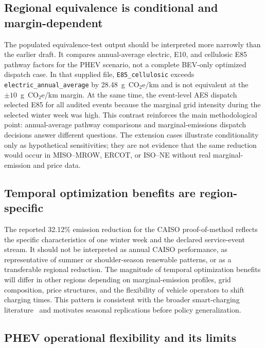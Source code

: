 \documentclass[cleantechnol,article,submit,pdftex,moreauthors]{Definitions/mdpi}
\newcommand{\gcoeqkm}{g~CO$_2$e/km}
\begin{document}
\subsection{Regional equivalence is conditional and margin-dependent}
\label{subsec:discuss_equivalence}

The populated equivalence-test output should be interpreted more narrowly than the earlier draft. It compares annual-average electric, E10, and cellulosic E85 pathway factors for the PHEV scenario, not a complete BEV-only optimized dispatch case. In that supplied file, \texttt{E85\_cellulosic} exceeds \texttt{electric\_annual\_average} by 28.48~\gcoeqkm{} and is not equivalent at the $\pm10$~\gcoeqkm{} margin. At the same time, the event-level AES dispatch selected E85 for all audited events because the marginal grid intensity during the selected winter week was high. This contrast reinforces the main methodological point: annual-average pathway comparisons and marginal-emissions dispatch decisions answer different questions. The extension cases illustrate conditionality only as hypothetical sensitivities; they are not evidence that the same reduction would occur in MISO--MROW, ERCOT, or ISO--NE without real marginal-emission and price data.


\subsection{Temporal optimization benefits are region-specific}
\label{subsec:discuss_temporal}

The reported 32.12\% emission reduction for the CAISO proof-of-method reflects the specific characteristics of one winter week and the declared service-event stream. It should not be interpreted as annual CAISO performance, as representative of summer or shoulder-season renewable patterns, or as a transferable regional reduction. The magnitude of temporal optimization benefits will differ in other regions depending on marginal-emission profiles, grid composition, price structures, and the flexibility of vehicle operators to shift charging times. This pattern is consistent with the broader smart-charging literature~\cite{GraffZivin2014,Holland2016} and motivates seasonal replications before policy generalization.


\subsection{PHEV operational flexibility and its limits}
\label{subsec:discuss_phev}
\end{document}
